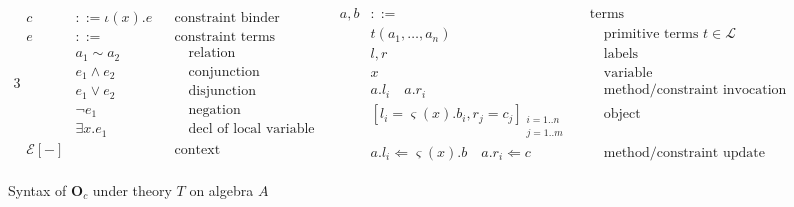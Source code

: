\begin{figure*}[t]
  \centering
  \begin{alignat*}{3}
    \begin{aligned}
      c   & ::= \iota(x) . e && \text{constraint binder}\\
      e   & ::= && \text{constraint terms}\\
          & a_1 \sim a_2   && \quad \text{relation}\\
          & e_1 \land e_2  && \quad \text{conjunction}\\
          & e_1 \vee e_2   && \quad \text{disjunction}\\
          & \neg e_1       && \quad \text{negation}\\
          & \exists x . e_1 && \quad \text{decl of local variable}\\
     \mathcal{E}[-] & && \text{context}
    \end{aligned}
    \quad
    \begin{aligned}
      a,b & ::= && \text{terms}\\
          & t(a_1, \ldots, a_n)   && \quad \text{primitive terms } t \in \mathcal{L} \\
          & l,r  && \quad \text{labels}\\
          & x    && \quad \text{variable}\\
          & a.l_i \quad a.r_i && \quad \text{method/constraint invocation}\\
          & [ l_i = \varsigma (x) . b_i , r_j = c_j ]_{\substack{i = 1..n\\j = 1..m}} && \quad \text{object}\\
          & a.l_i \Leftarrow \varsigma (x) . b \quad a.r_i \Leftarrow c && \quad \text{method/constraint update}
    \end{aligned}
  \end{alignat*}
  \caption{Syntax of $\textbf{O}_c$ under theory $T$ on algebra $A$}
  \label{Oc:syntax}
\end{figure*}

